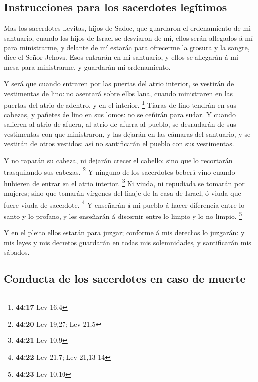 \hypertarget{instrucciones-para-los-sacerdotes-leguxedtimos}{%
\subsection{Instrucciones para los sacerdotes
legítimos}\label{instrucciones-para-los-sacerdotes-leguxedtimos}}

 Mas los sacerdotes Levitas, hijos de Sadoc, que guardaron
el ordenamiento de mi santuario, cuando los hijos de Israel se desviaron
de mí, ellos serán allegados á mí para ministrarme, y delante de mí
estarán para ofrecerme la grosura y la sangre, dice el Señor Jehová.
 Esos entrarán en mi santuario, y ellos se allegarán á mi
mesa para ministrarme, y guardarán mi ordenamiento.

 Y será que cuando entraren por las puertas del atrio
interior, se vestirán de vestimentas de lino: no asentará sobre ellos
lana, cuando ministraren en las puertas del atrio de adentro, y en el
interior. \footnote{\textbf{44:17} Lev 16,4}  Tiaras de
lino tendrán en sus cabezas, y pañetes de lino en sus lomos: no se
ceñirán para sudar.  Y cuando salieren al atrio de afuera,
al atrio de afuera al pueblo, se desnudarán de sus vestimentas con que
ministraron, y las dejarán en las cámaras del santuario, y se vestirán
de otros vestidos: así no santificarán el pueblo con sus vestimentas.

 Y no raparán su cabeza, ni dejarán crecer el cabello; sino
que lo recortarán trasquilando sus cabezas. \footnote{\textbf{44:20} Lev
  19,27; Lev 21,5}  Y ninguno de los sacerdotes beberá vino
cuando hubieren de entrar en el atrio interior. \footnote{\textbf{44:21}
  Lev 10,9}  Ni viuda, ni repudiada se tomarán por mujeres;
sino que tomarán vírgenes del linaje de la casa de Israel, ó viuda que
fuere viuda de sacerdote. \footnote{\textbf{44:22} Lev 21,7; Lev
  21,13-14}  Y enseñarán á mi pueblo á hacer diferencia
entre lo santo y lo profano, y les enseñarán á discernir entre lo limpio
y lo no limpio. \footnote{\textbf{44:23} Lev 10,10}

 Y en el pleito ellos estarán para juzgar; conforme á mis
derechos lo juzgarán: y mis leyes y mis decretos guardarán en todas mis
solemnidades, y santificarán mis sábados.

\hypertarget{conducta-de-los-sacerdotes-en-caso-de-muerte}{%
\subsection{Conducta de los sacerdotes en caso de
muerte}\label{conducta-de-los-sacerdotes-en-caso-de-muerte}}

